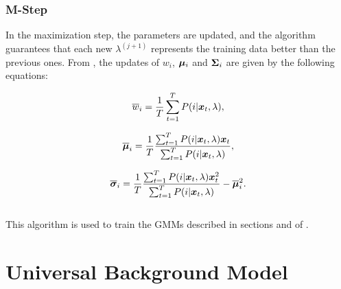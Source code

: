 \subsubsection*{M-Step}

In the maximization step, the parameters are updated, and the algorithm guarantees that each new $\lambda^(j+1)$ represents the training data better than the previous ones. From , the updates of $w_i$, $\boldsymbol{\mu}_i$ and $\boldsymbol{\Sigma}_i$ are given by the following equations:

\begin{equation}
    \overline{w}_i = \frac{1}{T} \sum_{t=1}^T \postprob{i}{\dvec{x}_t, \lambda},
    \label{eq:m-step-weight}
\end{equation}

\begin{equation}
    \overline{\dvec{\mu}}_i = \frac{1}{T} \frac{\sum_{t=1}^T \postprob{i}{\dvec{x}_t, \lambda} \dvec{x}_t}{\sum_{t=1}^T \postprob{i}{\dvec{x}_t, \lambda}},
    \label{eq:m-step-means}
\end{equation}

\begin{equation}
    \overline{\dvec{\sigma}}_i = \frac{1}{T} \frac{\sum_{t=1}^T \postprob{i}{\dvec{x}_t, \lambda} \dvec{x}_t^2}{\sum_{t=1}^T \postprob{i}{\dvec{x}_t, \lambda}} - \overline{\dvec{\mu}}_i^2.
    \label{eq:m-step-means}
\end{equation}
\\

This algorithm is used to train the GMMs described in sections  and  of .

\section{Universal Background Model}